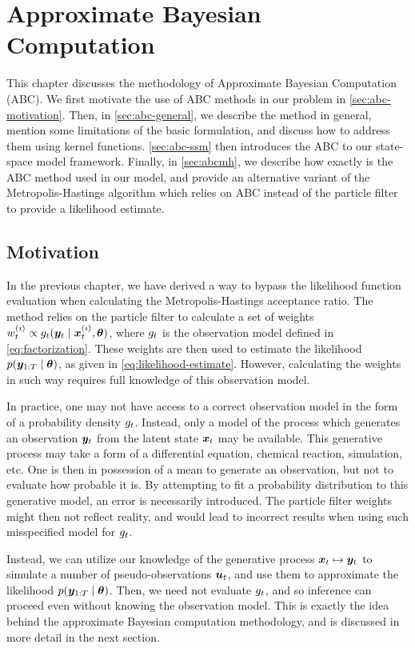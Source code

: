 \chapter{Approximate Bayesian Computation}
\label{chap:abc}

This chapter discusses the methodology of Approximate Bayesian Computation (ABC). We first motivate the use of ABC methods in our problem in \autoref{sec:abc-motivation}. Then, in \autoref{sec:abc-general}, we describe the method in general, mention some limitations of the basic formulation, and discuss how to address them using kernel functions. \autoref{sec:abc-ssm} then introduces the ABC to our state-space model framework. Finally, in \autoref{sec:abcmh}, we describe how exactly is the ABC method used in our model, and provide an alternative variant of the Metropolis-Hastings algorithm which relies on ABC instead of the particle filter to provide a likelihood estimate.


\section{Motivation} \label{sec:abc-motivation}
In the previous chapter, we have derived a way to bypass the likelihood function evaluation when calculating the Metropolis-Hastings acceptance ratio. The method relies on the particle filter to calculate a set of weights $w_t^{(i)} \propto g_t(\bm{y}_t \mid \bm{x}_t^{(i)}, \bm{\theta})$, where $g_t$ is the observation model defined in \eqref{eq:factorization}. These weights are then used to estimate the likelihood $p(\bm{y}_{1:T} \mid \bm{\theta})$, as given in \eqref{eq:likelihood-estimate}. However, calculating the weights in such way requires full knowledge of this observation model.

In practice, one may not have access to a correct observation model in the form of a probability density $g_t$. Instead, only a model of the process which generates an observation $\bm{y}_t$ from the latent state $\bm{x}_t$ may be available. This generative process may take a form of a differential equation, chemical reaction, simulation, etc. One is then in possession of a mean to generate an observation, but not to evaluate how probable it is. By attempting to fit a probability distribution to this generative model, an error is necessarily introduced. The particle filter weights might then not reflect reality, and would lead to incorrect results when using such misspecified model for $g_t$.

Instead, we can utilize our knowledge of the generative process $\bm{x}_t \mapsto \bm{y}_t$ to simulate a number of pseudo-observations $\bm{u}_t$, and use them to approximate the likelihood $p(\bm{y}_{1:T} \mid \bm{\theta})$. Then, we need not evaluate $g_t$, and so inference can proceed even without knowing the observation model. This is exactly the idea behind the approximate Bayesian computation methodology, and is discussed in more detail in the next section.


